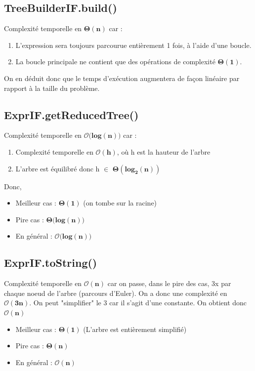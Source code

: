 \documentclass[12pt, a4paper, table]{article}
\begin{document}
\subsection{TreeBuilderIF.build()}
\noindent Complexité temporelle en $\mathbf{\Theta (n)}$ car :

\begin{enumerate}
	\item L'expression sera toujours parcourue entièrement 1 fois, à l'aide d'une boucle.
	\item La boucle principale ne contient que des opérations de complexité $\mathbf{\Theta (1)}$.
\end{enumerate}

\noindent On en déduit donc que le temps d'exécution augmentera de façon linéaire par rapport à la taille du problème.

\subsection{ExprIF.getReducedTree()}
\noindent Complexité temporelle en $\mathbf{\mathcal{O}(}\mathbf{log (n))}$ car :
\begin{enumerate}
	\item Complexité temporelle en $\mathbf{\mathcal{O}(h)}$, où h est la hauteur de l’arbre
	\item L'arbre est équilibré donc h $\in$ $\mathbf{\Theta(\mathbf{log}_{2} (n))}$
\end{enumerate}
Donc, 
\begin{itemize}
	\item Meilleur cas : $\mathbf{\Theta (1)}$ (on tombe sur la racine)
	\item Pire cas : $\mathbf{\Theta(}\mathbf{log (n))}$
	\item En général : $\mathbf{\mathcal{O}(}\mathbf{log (n))}$
\end{itemize}



\subsection{ExprIF.toString()}
\noindent Complexité temporelle en $\mathbf{\mathcal{O}(n)}$ car on passe, dans le pire des cas, 3x par chaque noeud de l'arbre (parcours d'Euler). On a donc une complexité en  $\mathbf{\mathcal{O}(3n)}$. On peut "simplifier" le 3 car il s'agit d'une constante. On obtient donc $\mathbf{\mathcal{O}(n)}$  

\begin{itemize}
	\item Meilleur cas : $\mathbf{\Theta (1)}$ (L'arbre est entièrement simplifié)
	\item Pire cas : $\mathbf{\Theta(n)}$
	\item En général : $\mathbf{\mathcal{O}(n)}$
\end{itemize}
\end{document}
